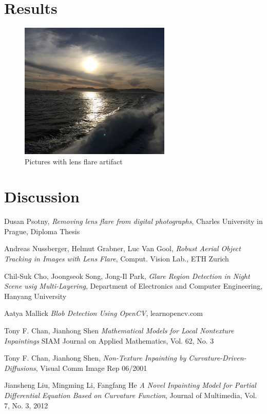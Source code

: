 \documentclass[10pt,twocolumn]{article}
\begin{document}
\section{Results}

\lipsum[1]

\begin{figure}[ht!]
\centering
\includegraphics[width=72mm]{../Matlab/Images/1.jpg}
\caption{Pictures with lens flare artifact}
\end{figure}

\section{Discussion}

\lipsum[1]

\begin{thebibliography}{1}

\bibitem
Dusan Psotny,
\emph{Removing lens flare from digital photographs},
Charles University in Prague, Diploma Thesis

\bibitem
Andreas Nussberger, Helmut Grabner, Luc Van Gool,
\emph{Robust Aerial Object Tracking in Images with Lens Flare},
Comput. Vision Lab., ETH Zurich

\bibitem
Chil-Suk Cho, Joongseok Song, Jong-Il Park,
\emph{Glare Region Detection in Night Scene usig Multi-Layering},
Department of Electronics and Computer Engineering, Hanyang University

\bibitem
Aatya Mallick
\emph{Blob Detection Using OpenCV},
learnopencv.com

\bibitem
Tony F. Chan, Jianhong Shen
\emph{Mathematical Models for Local Nontexture Inpaintings}
SIAM Journal on Applied Mathematics, Vol. 62, No. 3

\bibitem
Tony F. Chan, Jianhong Shen,
\emph{Non-Texture Inpainting by Curvature-Driven-Diffusions},
Visual Comm Image Rep 06/2001

\bibitem
Jiansheng Liu, Mingming Li, Fangfang He
\emph{A Novel Inpainting Model for Partial Differential Equation Based on Curvature Function},
Journal of Multimedia, Vol. 7, No. 3, 2012

\end{thebibliography}
\end{document}
